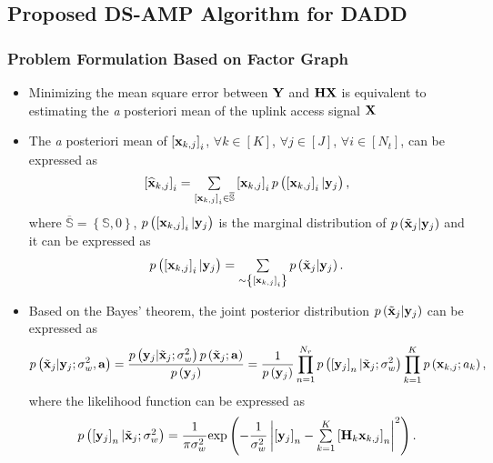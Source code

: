 \documentclass[9pt]{beamer}
\let \it = \textit
\begin{document}
\subsection{Proposed DS-AMP Algorithm for DADD}
\begin{frame}
\frametitle{Problem Formulation Based on Factor Graph}
\begin{itemize}
\item
Minimizing the mean square error between ${\bf Y}$ and ${\bf HX}$ is equivalent to estimating the {\it a posteriori} mean of the uplink access signal ${\bf X}$
\item
The {\it a posteriori} mean of $\left[{{\bf x}_{k,j}}\right]_i$, $\forall k\in[K]$, $\forall j\in[J]$, $\forall i\in[N_t]$, can be expressed as
\begin{equation}\label{eq:PosMeanGeneral}
\begin{array}{l}
\left[{\widehat{\bf x}_{k,j}}\right]_i=\sum\limits_{\left[{{\bf x}_{k,j}}\right]_i\in \mathbb{\overline S}}\left[{{\bf x}_{k,j}}\right]_i p\left({\left[{{\bf x}_{k,j}}\right]_i|{\bf y}_j}\right),
\end{array}
\end{equation}
where $\mathbb{\overline S}=\left\{{\mathbb{S},0}\right\}$, $p\left({\left[{{\bf x}_{k,j}}\right]_i|{\bf y}_j}\right)$ is the marginal distribution of $p\left({\tilde{\bf x}_j|{\bf y}_j}\right)$ and it can be expressed as
\begin{equation}\label{eq:MarginalGenaral}
\begin{array}{l}
p\left({\left[{{\bf x}_{k,j}}\right]_i|{\bf y}_j}\right)=\sum\limits_{\sim\left\{{\left[{{\bf x}_{k,j}}\right]_i}\right\}} p\left({\tilde{\bf x}_j|{\bf y}_j}\right).
\end{array}
\end{equation}
\item
Based on the Bayes' theorem, the joint posterior distribution $p\left({\tilde{\bf x}_j|{\bf y}_j}\right)$ can be expressed as
\begin{equation}\label{eq:PosDistriGeneral}
\begin{split}
p\left({\tilde{\bf x}_j|{\bf y}_j;\sigma_w^2, {\bf a}}\right)=\dfrac{p\left({{\bf y}_j|\tilde{\bf x}_j;\sigma_w^2}\right)p\left({\tilde{\bf x}_j;{\bf a}}\right)}{p\left({{\bf y}_j}\right)}
=\dfrac{1}{p\left({{\bf y}_j}\right)} \prod\limits_{n=1}^{N_r}p\left({\left[{{\bf y}_j}\right]_n|\tilde{\bf x}_j;\sigma_w^2}\right) \prod\limits_{k=1}^{K}p\left({{\bf x}_{k,j}; a_k}\right),\\
\end{split}
\end{equation}
where the likelihood function can be expressed as
\begin{equation}\label{eq:LikelihoodGeneral}
\begin{array}{l}
p\left({\left[{{\bf y}_j}\right]_n|\tilde{\bf x}_j;\sigma_w^2}\right)=\dfrac{1}{\pi \sigma_w^2}{\rm exp}\left({-\dfrac{1}{\sigma_w^2}\left| {\left[{{\bf y}_j}\right]_n-\sum\limits_{k=1}^{K}\left[{{\bf H}_k{\bf x}_{k,j}}\right]_n} \right|^2}\right).
\end{array}
\end{equation}
\end{itemize}
\end{frame}
\end{document}
